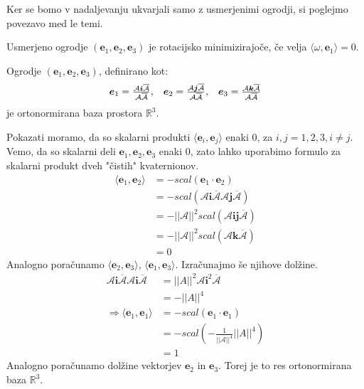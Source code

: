 \documentclass[mat1]{fmfdelo}
\newcommand{\R}{\mathbb R}
\newcommand{\ii}{\boldsymbol i}
\newcommand{\jj}{\boldsymbol j}
\newcommand{\kk}{\boldsymbol k}
\newcommand{\e}{\boldsymbol e}
\newcommand{\A}{\mathcal A}
\begin{document}
Ker se bomo v nadaljevanju ukvarjali samo z usmerjenimi ogrodji, si poglejmo povezavo med le temi.
\begin{definicija}
Usmerjeno ogrodje $(\e_1,\e_2,\e_3)$ je rotacijsko minimizirajoče, če velja $\langle \omega,\e_1\rangle = 0.$
\end{definicija}

\begin{trditev}
Ogrodje $(\e_1,\e_2,\e_3)$, definirano kot: 
\begin{equation*}
\begin{array}{c c c}
\e_1 = \frac{\A\ii\overline{\A}}{\A\overline{\A}}, &
\e_2 = \frac{\A\jj\overline{\A}}{\A\overline{\A}}, &
\e_3 = \frac{\A\kk\overline{\A}}{\A\overline{\A}}
\end{array}
\end{equation*}
je ortonormirana baza prostora $\R^3$.
\end{trditev}
\begin{dokaz}
Pokazati moramo, da so skalarni produkti $\langle \e_i, \e_j \rangle $ enaki 0, za $i, j = 1,2,3, i \neq j$. Vemo, da so skalarni deli $\e_1,\e_2,\e_3$ enaki 0, zato lahko uporabimo formulo za skalarni produkt dveh "čistih" kvaternionov.
\begin{equation*}
\begin{split}
	\langle \e_1,\e_2 \rangle& = -scal \left( \e_1 \cdot \e_2 \right) \\
	& = -scal \left( \A \ii \overline{\A} \A \jj \overline{\A} \right) \\
	&= - ||\A||^2 scal \left( \A \ii \jj \overline{\A} \right) \\
	& = - ||\A||^2 scal \left( \A \kk \overline{\A} \right) \\
	& = 0
\end{split}
\end{equation*}
Analogno poračunamo $\langle \e_2,\e_3 \rangle$, $\langle \e_1,\e_3 \rangle$.
Izračunajmo še njihove dolžine.
\begin{equation*}
\begin{split}
\A \ii \overline{\A} \A \ii \overline{\A} 	&= ||A||^2 \A \ii^2 \overline{\A} \\
	&= -||A||^4 \\
	\Longrightarrow \langle \e_1,\e_1 \rangle &= -scal \left( \e_1 \cdot \e_1 \right) \\
	&= -scal (-\frac{1}{||\A||^4}||A||^4) \\
	&= 1
\end{split}
\end{equation*}
Analogno poračunamo dolžine vektorjev $\e_2$ in $\e_3$. Torej je to res ortonormirana baza $\R^3$.
\end{dokaz}
\end{document}
